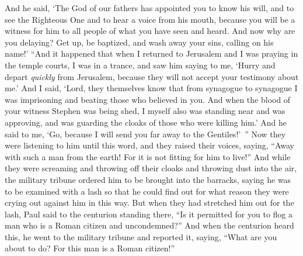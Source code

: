 \begin{biblechapter}
\verse And he said, ‘The God of our fathers has appointed you to know his will, and to see the Righteous One and to hear a voice from his mouth,
\verse because you will be a witness for him to all people of what you have seen and heard.
\verse And now why are you delaying? Get up, be baptized, and wash away your sins, calling on his name!’
\verse “And it happened that when I returned to Jerusalem and I was praying in the temple courts, I was in a trance,
\verse and saw him saying to me, ‘Hurry and depart \textit{quickly} from Jerusalem, because they will not accept your testimony about me.’
\verse And I said, ‘Lord, they themselves know that from synagogue to synagogue I was imprisoning and beating those who believed in you.
\verse And when the blood of your witness Stephen was being shed, I myself also was standing near and was approving, and was guarding the cloaks of those who were killing him.’
\verse And he said to me, ‘Go, because I will send you far away to the Gentiles!’ ”
 Now they were listening to him until this word, and they raised their voices, saying, “Away with such a man from the earth! For it is not fitting for him to live!”
\verse And while they were screaming and throwing off their cloaks and throwing dust into the air,
\verse the military tribune ordered him to be brought into the barracks, saying he was to be examined with a lash so that he could find out for what reason they were crying out against him in this way.
\verse But when they had stretched him out for the lash, Paul said to the centurion standing there, “Is it permitted for you to flog a man who is a Roman citizen and uncondemned?”
\verse And when the centurion heard this, he went to the military tribune and reported it, saying, “What are you about to do? For this man is a Roman citizen!”

\end{biblechapter}
